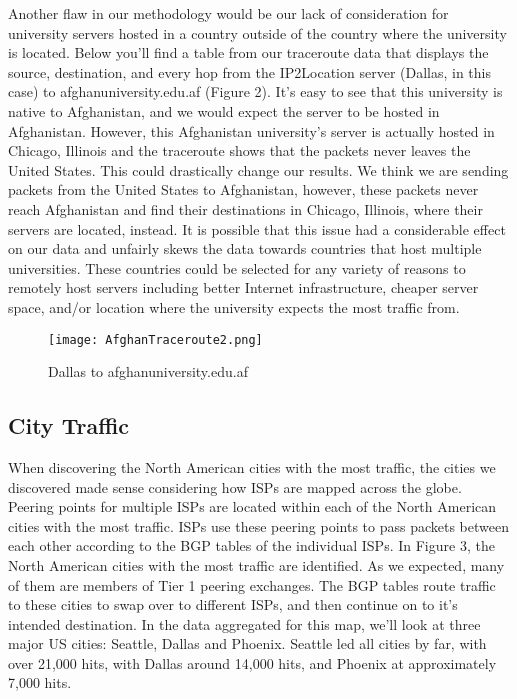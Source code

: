 \documentclass{sigcomm-alternate}
\begin{document}
	Another flaw in our methodology would be our lack of consideration for university servers hosted in a country outside of the country where the university is located. Below you’ll find a table from our traceroute data that displays the source, destination, and every hop from the IP2Location server (Dallas, in this case) to afghanuniversity.edu.af (Figure 2). It’s easy to see that this university is native to Afghanistan, and we would expect the server to be hosted in Afghanistan. However, this Afghanistan university’s server is actually hosted in Chicago, Illinois and the traceroute shows that the packets never leaves the United States. This could drastically change our results. We think we are sending packets from the United States to Afghanistan, however, these packets never reach Afghanistan and find their destinations in Chicago, Illinois, where their servers are located, instead. It is possible that this issue had a considerable effect on our data and unfairly skews the data towards countries that host multiple universities. These countries could be selected for any variety of reasons to remotely host servers including better Internet infrastructure, cheaper server space, and/or location where the university expects the most traffic from.
	
\begin{figure}[h!]
  \caption{Dallas to afghanuniversity.edu.af}
  \centering
    \texttt{[image: AfghanTraceroute2.png]}
\end{figure}	

\subsection{City Traffic}
When discovering the North American cities with the most traffic, the cities we discovered made sense considering how ISPs are mapped across the globe. Peering points for multiple ISPs are located within each of the North American cities with the most traffic. ISPs use these peering points to pass packets between each other according to the BGP tables of the individual ISPs. In Figure 3, the North American cities with the most traffic are identified. As we expected, many of them are members of Tier 1 peering exchanges. The BGP tables route traffic to these cities to swap over to different ISPs, and then continue on to it’s intended destination. In the data aggregated for this map, we’ll look at three major US cities: Seattle, Dallas and Phoenix. Seattle led all cities by far, with over 21,000 hits, with Dallas around 14,000 hits, and Phoenix at approximately 7,000 hits. 
\end{document}
